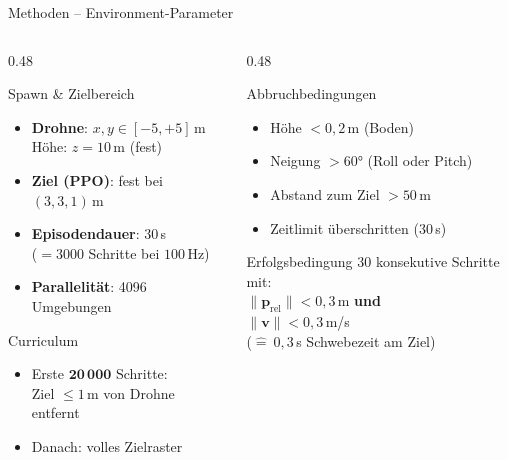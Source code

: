 \begin{frame}{Methoden -- Environment-Parameter}
\begin{columns}[T]
\begin{column}{0.48\textwidth}
  \begin{block}{Spawn \& Zielbereich}
    \begin{itemize}
      \item \textbf{Drohne}: $x, y \in [-5, +5]\,$m\\
            Höhe: $z = 10\,$m (fest)
      \item \textbf{Ziel (PPO)}: fest bei $(3, 3, 1)\,$m
      \item \textbf{Episodendauer}: $30\,$s\\
            ($= 3000$ Schritte bei $100\,$Hz)
      \item \textbf{Parallelität}: 4096 Umgebungen
    \end{itemize}
  \end{block}
  \begin{block}{Curriculum}
    \begin{itemize}
      \item Erste $\mathbf{20\,000}$ Schritte:\\
            Ziel $\leq 1\,$m von Drohne entfernt
      \item Danach: volles Zielraster
    \end{itemize}
  \end{block}
\end{column}
\begin{column}{0.48\textwidth}
  \begin{alertblock}{Abbruchbedingungen}
    \begin{itemize}
      \item Höhe $< 0{,}2\,$m (Boden)
      \item Neigung $> 60°$ (Roll oder Pitch)
      \item Abstand zum Ziel $> 50\,$m
      \item Zeitlimit überschritten ($30\,$s)
    \end{itemize}
  \end{alertblock}
  \begin{exampleblock}{Erfolgsbedingung}
    $30$ konsekutive Schritte mit:\\
    $\|\mathbf{p}_\text{rel}\| < 0{,}3\,$m \textbf{und}\\
    $\|\mathbf{v}\| < 0{,}3\,$m/s
    \vspace{0.2em}\\
    {\small ($\hat{=}\ 0{,}3\,$s Schwebezeit am Ziel)}
  \end{exampleblock}
\end{column}
\end{columns}
\end{frame}


